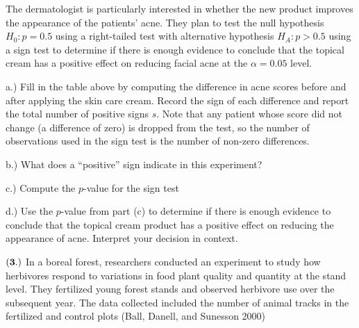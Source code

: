 \documentclass[
]{article}
\begin{document}
The dermatologist is particularly interested in whether the new product
improves the appearance of the patients' acne. They plan to test the
null hypothesis \(H_0: p = 0.5\) using a right-tailed test with
alternative hypothesis \(H_A: p>0.5\) using a sign test to determine if
there is enough evidence to conclude that the topical cream has a
positive effect on reducing facial acne at the \(\alpha = 0.05\) level.

a.) Fill in the table above by computing the difference in acne scores
before and after applying the skin care cream. Record the sign of each
difference and report the total number of positive signs \(s\). Note
that any patient whose score did not change (a difference of zero) is
dropped from the test, so the number of observations used in the sign
test is the number of non-zero differences.

b.) What does a ``positive'' sign indicate in this experiment?

c.) Compute the \(p\)-value for the sign test

d.) Use the \(p\)-value from part (c) to determine if there is enough
evidence to conclude that the topical cream product has a positive
effect on reducing the appearance of acne. Interpret your decision in
context.

\(\bf (3.)\) In a boreal forest, researchers conducted an experiment to
study how herbivores respond to variations in food plant quality and
quantity at the stand level. They fertilized young forest stands and
observed herbivore use over the subsequent year. The data collected
included the number of animal tracks in the fertilized and control plots
(Ball, Danell, and Sunesson 2000)
\end{document}
